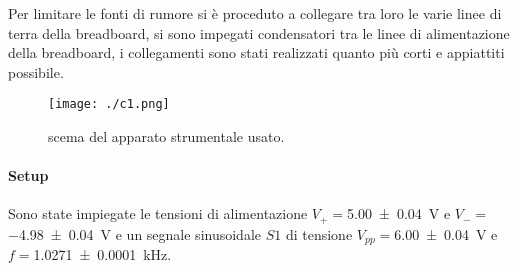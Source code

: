 	Per limitare le fonti di rumore si è proceduto a collegare tra loro le varie linee di terra della breadboard,
	si sono impegati condensatori tra le linee di alimentazione della breadboard, i collegamenti sono stati realizzati quanto più corti e appiattiti possibile.
	\begin{figure}[ht]
		\centering
		\texttt{[image: ./c1.png]}
		\caption{scema del apparato strumentale usato.}
		\label{f:complessivo}
	\end{figure}
\paragraph{Setup}
	Sono state impiegate le tensioni di alimentazione 
	$V_{+}=$\SI{ 5.00 \pm 0.04}{\volt} e $V_{-}=$\SI{ -4.98 \pm 0.04}{\volt}
	e un segnale sinusoidale $S1$ di tensione $V_{pp}=$\SI{6.00\pm 0.04}{\volt} e $f=$\SI{1.0271 \pm 0.0001}{\kilo \hertz}.
